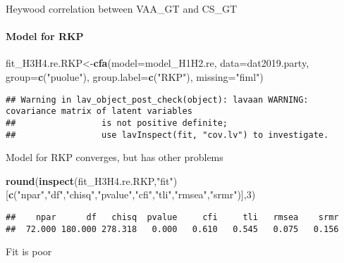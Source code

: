 \documentclass[
]{article}
\newenvironment{Shaded}{\begin{snugshade}}{\end{snugshade}}
\newcommand{\DataTypeTok}[1]{\textcolor[rgb]{0.13,0.29,0.53}{#1}}
\newcommand{\DecValTok}[1]{\textcolor[rgb]{0.00,0.00,0.81}{#1}}
\newcommand{\KeywordTok}[1]{\textcolor[rgb]{0.13,0.29,0.53}{\textbf{#1}}}
\newcommand{\NormalTok}[1]{#1}
\newcommand{\StringTok}[1]{\textcolor[rgb]{0.31,0.60,0.02}{#1}}
\begin{document}
Heywood correlation between VAA\_GT and CS\_GT

\newpage

\hypertarget{model-for-rkp}{%
\paragraph{Model for RKP}\label{model-for-rkp}}

\begin{Shaded}
\begin{Highlighting}[]
\NormalTok{fit_H3H4.re.RKP<-}\KeywordTok{cfa}\NormalTok{(}\DataTypeTok{model=}\NormalTok{model_H1H2.re,}
                    \DataTypeTok{data=}\NormalTok{dat2019.party,}
                    \DataTypeTok{group=}\KeywordTok{c}\NormalTok{(}\StringTok{"puolue"}\NormalTok{),}
                    \DataTypeTok{group.label=}\KeywordTok{c}\NormalTok{(}\StringTok{"RKP"}\NormalTok{),}
                    \DataTypeTok{missing=}\StringTok{"fiml"}\NormalTok{)}
\end{Highlighting}
\end{Shaded}

\begin{verbatim}
## Warning in lav_object_post_check(object): lavaan WARNING: covariance matrix of latent variables
##                 is not positive definite;
##                 use lavInspect(fit, "cov.lv") to investigate.
\end{verbatim}

Model for RKP converges, but has other problems

\begin{Shaded}
\begin{Highlighting}[]
\KeywordTok{round}\NormalTok{(}\KeywordTok{inspect}\NormalTok{(fit_H3H4.re.RKP,}\StringTok{"fit"}\NormalTok{)}
\NormalTok{      [}\KeywordTok{c}\NormalTok{(}\StringTok{"npar"}\NormalTok{,}\StringTok{"df"}\NormalTok{,}\StringTok{"chisq"}\NormalTok{,}\StringTok{"pvalue"}\NormalTok{,}\StringTok{"cfi"}\NormalTok{,}\StringTok{"tli"}\NormalTok{,}\StringTok{"rmsea"}\NormalTok{,}\StringTok{"srmr"}\NormalTok{)],}\DecValTok{3}\NormalTok{)}
\end{Highlighting}
\end{Shaded}

\begin{verbatim}
##    npar      df   chisq  pvalue     cfi     tli   rmsea    srmr 
##  72.000 180.000 278.318   0.000   0.610   0.545   0.075   0.156
\end{verbatim}

Fit is poor
\end{document}
